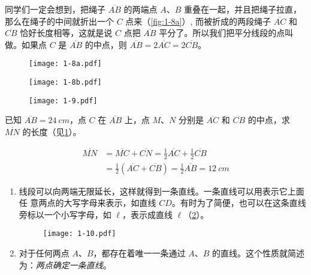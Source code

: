 同学们一定会想到，把绳子 $\overline{AB}$ 的两端点 $A$、$B$ 重叠在一起，并且把绳子拉直，那么在绳子的中间就折出一个 $C$ 点来（\cref{fig:1-8a}）, 而被折成的两段绳子 $\overline{AC}$ 和 $\overline{CB}$ 恰好长度相等，这就是说 $C$ 点把 $\overline{AB}$ 平分了。所以我们把平分线段的点叫做。如果点 $C$ 是 $\overline{AB}$ 的中点，则 $\overline{AB}=2\overline{AC}=2\overline{CB}$。

\begin{figure}
  \begin{minipage}[b]{0.48\linewidth}
    \centering
		\begin{minipage}{0.5\linewidth}\raggedleft
		  \texttt{[image: 1-8a.pdf]}
		\end{minipage}%
		\begin{minipage}{0.1\linewidth}
		  \subcaption{}\label{fig:1-8a}
		\end{minipage}
		\par\bigskip
		\begin{minipage}{0.5\linewidth}\raggedleft
		  \texttt{[image: 1-8b.pdf]}
		\end{minipage}%
		\begin{minipage}{0.1\linewidth}
		  \subcaption{}\label{fig:1-8b}
		\end{minipage}
    \caption{}\label{fig:1-8}
	\end{minipage}
	\begin{minipage}[b]{0.48\linewidth}
    \centering
		\texttt{[image: 1-9.pdf]}
    \caption{}\label{fig:1-9}
  \end{minipage}
\end{figure}

\begin{example}\label{exp:half_length}
	已知 $\overline{AB}=\qty{24}{cm}$，点 $C$ 在 $\overline{AB}$ 上，点 $M$、$N$ 分别是 $\overline{AC}$ 和 $\overline{CB}$ 的中点，求 $\overline{MN}$ 的长度（见\cref{fig:1-9}）。
\end{example}

\begin{solution}
\[\begin{split}
	\overline{MN}&=\overline{MC}+\overline{CN}=\frac{1}{2}\overline{AC}+\frac{1}{2}\overline{CB}\\
	&=\frac{1}{2}\left(\overline{AC}+\overline{CB}\right)=\frac{1}{2}\overline{AB}=\qty{12}{cm}
\end{split}\]
\end{solution}

\begin{enumerate}[resume=conclusion]%
	\item 线段可以向两端无限延长，这样就得到一条直线。一条直线可以用表示它上面任	意两点的大写字母来表示，如直线 $CD$。有时为了简便，也可以在这条直线旁标以一个小写字母，如 $\ell$，表示成直线 $\ell$（\cref{fig:1-10}）。
	\begin{figure}
		\texttt{[image: 1-10.pdf]}
		\caption{}\label{fig:1-10}
	\end{figure}
	\item 对于任何两点 $A$、$B$，都存在着唯一一条通过 $A$、$B$ 的直线。这个性质就简述为：\emph{两点确定一条直线}。
\end{enumerate}

